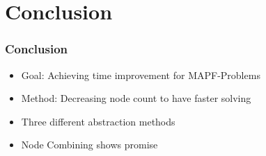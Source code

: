 \documentclass{beamer}
\begin{document}
\section{Conclusion}
\begin{frame}
\frametitle{Conclusion}
\begin{itemize}
\item<2-> Goal: Achieving time improvement for MAPF-Problems
\medskip
\item<3-> Method: Decreasing node count to have faster solving
\medskip
\item<4-> Three different abstraction methods
\medskip
\item<5-> Node Combining shows promise
\end{itemize}
\end{frame}
\end{document}
